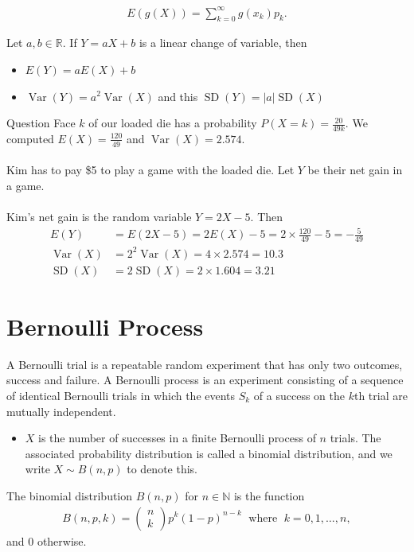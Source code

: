 \documentclass{report}
\newcommand{\cvec}[1]{ \begin{pmatrix} #1 \end{pmatrix} }
\begin{document}
\begin{enumerate}
	\begin{align*}
		E(g(X)) = \sum_{k=0}^\infty g(x_k)p_k.
	\end{align*}

	Let $a,b \in \mathbb{R}$. If $Y = aX + b$ is a linear change of variable, then
	\begin{itemize}
		\item $E(Y) = aE(X) + b$
		\item $\operatorname{Var}(Y) = a^2 \operatorname{Var}(X)$ and this $\operatorname{SD}(Y) = |a|\operatorname{SD}(X)$
	\end{itemize}

	\begin{question}{Question}
		Face $k$ of our loaded die has a probability $P(X = k) = \frac{20}{49k}$. We computed $E(X) = \frac{120}{49}$ and $\operatorname{Var}(X) = 2.574$.
		\\ \\
		Kim has to pay \$5 to play a game with the loaded die. Let $Y$ be their net gain in a game.
		\\ \\
		Kim's net gain is the random variable $Y = 2X - 5$. Then 
		\begin{align*}
			E(Y) &= E(2X - 5) = 2E(X) - 5 = 2 \times \frac{120}{49} - 5 = -\frac{5}{49}	\\
			\operatorname{Var}(X) &= 2^2 \operatorname{Var}(X) = 4 \times 2.574 = 10.3 	\\
			\operatorname{SD}(X) &= 2 \operatorname{SD}(X) = 2 \times 1.604 = 3.21
		\end{align*}
	\end{question}

	\section{Bernoulli Process}
	
		A Bernoulli trial is a repeatable random experiment that has only two outcomes, success and failure. A Bernoulli process is an experiment consisting of a sequence of identical Bernoulli trials in which the events $S_k$ of a success on the $k$th trial are mutually independent.

		\begin{itemize}
			\item $X$ is the number of successes in a finite Bernoulli process of $n$ trials. The associated probability distribution is called a binomial distribution, and we write $X \sim B(n,p)$ to denote this.
		\end{itemize}
		The binomial distribution $B(n,p)$ for $n \in \mathbb{N}$ is the function
		\begin{align*}
			B(n,p,k) = \cvec{n\\k} p^k(1-p)^{n-k} \; \text{ where } \; k = 0, 1, \dots, n,
		\end{align*}
		and 0 otherwise.
		

\end{enumerate}
\end{document}

